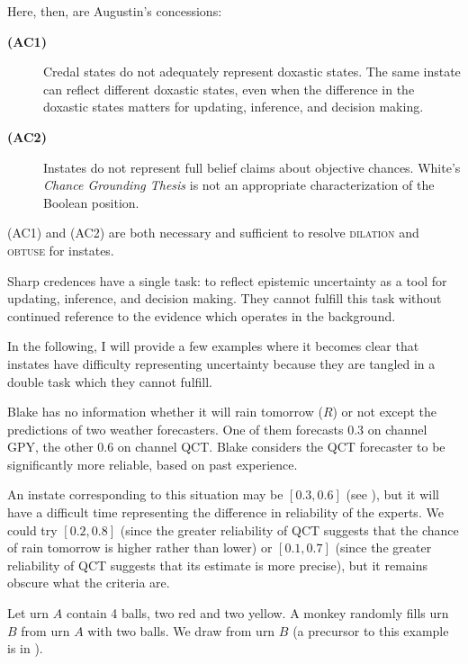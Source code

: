 \documentclass[11pt]{article}
\begin{document}
Here, then, are Augustin's concessions:

\begin{description}
\item[{\bf (AC1)}] Credal states do not adequately represent doxastic
  states. The same instate can reflect different doxastic states, even
  when the difference in the doxastic states matters for updating,
  inference, and decision making.
\item[{\bf (AC2)}] Instates do not represent full belief claims about
  objective chances. White's \emph{Chance Grounding Thesis} is not an
  appropriate characterization of the Boolean position.
\end{description}

(AC1) and (AC2) are both necessary and sufficient to resolve
\textsc{dilation} and \textsc{obtuse} for instates. 

Sharp credences have a single task: to reflect epistemic uncertainty
as a tool for updating, inference, and decision making. They cannot
fulfill this task without continued reference to the evidence which
operates in the background.

In the following, I will provide a few examples where it becomes clear
that instates have difficulty representing uncertainty because they
are tangled in a double task which they cannot fulfill.

\begin{quotex}
  \label{ex:aggreg} Blake has no
  information whether it will rain tomorrow ($R$) or not except the
  predictions of two weather forecasters. One of them forecasts 0.3 on
  channel GPY, the other 0.6 on channel QCT. Blake considers the QCT
  forecaster to be significantly more reliable, based on past
  experience.
\end{quotex}

An instate corresponding to this situation may be $[0.3,0.6]$ (see
), but it will have a difficult time
representing the difference in reliability of the experts. We could
try $[0.2,0.8]$ (since the greater reliability of QCT suggests that
the chance of rain tomorrow is higher rather than lower) or
$[0.1,0.7]$ (since the greater reliability of QCT suggests that its
estimate is more precise), but it remains obscure what the criteria
are.

\begin{quotex}
  \label{ex:monkey} Let urn $A$ contain 4
  balls, two red and two yellow. A monkey randomly fills urn $B$ from
  urn $A$ with two balls. We draw from urn $B$ (a precursor to this
  example is in ).
\end{quotex}
\end{document}

